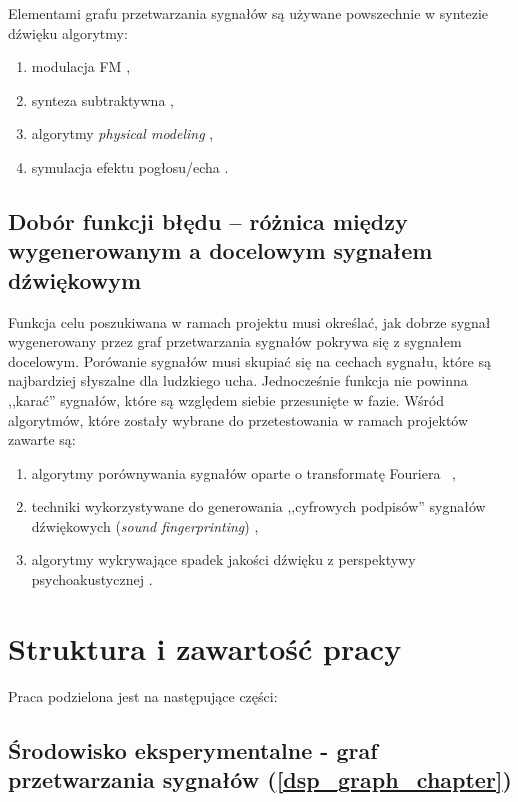 Elementami grafu przetwarzania sygnałów są używane powszechnie w syntezie dźwięku algorytmy:

\begin{enumerate}
  \item modulacja FM \cite{spectral_audio_processing} \cite{computational_music_synthesis},
  \item synteza subtraktywna \cite{computational_music_synthesis} \cite{digital_filters},
  \item algorytmy \textit{physical modeling} \cite{lisp_synthesis} \cite{computational_music_synthesis},
  \item symulacja efektu pogłosu/echa \cite{reverb} \cite{freeverb}.
\end{enumerate}

\subsection{Dobór funkcji błędu -- różnica między wygenerowanym a docelowym sygnałem dźwiękowym}

Funkcja celu poszukiwana w ramach projektu musi określać, jak dobrze sygnał wygenerowany przez
graf przetwarzania sygnałów pokrywa się z sygnałem docelowym. Porówanie sygnałów musi skupiać się
na cechach sygnału, które są najbardziej słyszalne dla ludzkiego ucha. Jednocześnie funkcja nie powinna
,,karać'' sygnałów, które są względem siebie przesunięte w fazie. Wśród algorytmów, które zostały wybrane
do przetestowania w ramach projektów zawarte są:

\begin{enumerate}
  \item algorytmy porównywania sygnałów oparte o transformatę Fouriera~\cite{sliding_fourier} \cite{mfcc},
  \item techniki wykorzystywane do generowania ,,cyfrowych podpisów'' sygnałów dźwiękowych (\textit{sound fingerprinting}) \cite{computer_vision_music_identification},
  \item algorytmy wykrywające spadek jakości dźwięku z perspektywy psychoakustycznej \cite{peaq} \cite{frechet_audio_distance}.
\end{enumerate}

\section{Struktura i zawartość pracy}

Praca podzielona jest na następujące części:

\subsection*{Środowisko eksperymentalne - graf przetwarzania sygnałów (\ref{dsp_graph_chapter}) }

